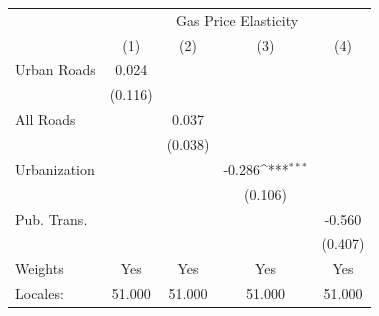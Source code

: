 {
\def\sym#1{\ifmmode^{#1}\else\(^{#1}\)\fi}
\begin{tabular}{l*{4}{c}}
\hline\hline
            &\multicolumn{4}{c}{Gas Price Elasticity}                                               \\
            &\multicolumn{1}{c}{(1)}         &\multicolumn{1}{c}{(2)}         &\multicolumn{1}{c}{(3)}         &\multicolumn{1}{c}{(4)}         \\
\hline
Urban Roads &       0.024         &                     &                     &                     \\
            &     (0.116)         &                     &                     &                     \\
[1em]
All Roads   &                     &       0.037         &                     &                     \\
            &                     &     (0.038)         &                     &                     \\
[1em]
Urbanization&                     &                     &      -0.286\sym{***}&                     \\
            &                     &                     &     (0.106)         &                     \\
[1em]
Pub. Trans. &                     &                     &                     &      -0.560         \\
            &                     &                     &                     &     (0.407)         \\
\hline
Weights     &         Yes         &         Yes         &         Yes         &         Yes         \\
Locales:    &      51.000         &      51.000         &      51.000         &      51.000         \\
\hline\hline
\end{tabular}
}
